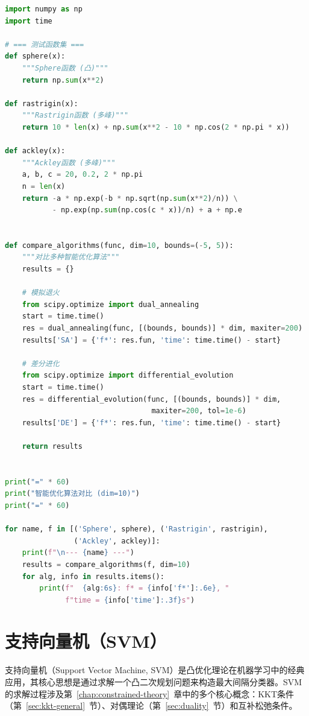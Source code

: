 \begin{lstlisting}[language=Python, caption=多种智能算法对比测试]
import numpy as np
import time

# === 测试函数集 ===
def sphere(x):
    """Sphere函数 (凸)"""
    return np.sum(x**2)

def rastrigin(x):
    """Rastrigin函数 (多峰)"""
    return 10 * len(x) + np.sum(x**2 - 10 * np.cos(2 * np.pi * x))

def ackley(x):
    """Ackley函数 (多峰)"""
    a, b, c = 20, 0.2, 2 * np.pi
    n = len(x)
    return -a * np.exp(-b * np.sqrt(np.sum(x**2)/n)) \
           - np.exp(np.sum(np.cos(c * x))/n) + a + np.e


def compare_algorithms(func, dim=10, bounds=(-5, 5)):
    """对比多种智能优化算法"""
    results = {}
    
    # 模拟退火
    from scipy.optimize import dual_annealing
    start = time.time()
    res = dual_annealing(func, [(bounds, bounds)] * dim, maxiter=200)
    results['SA'] = {'f*': res.fun, 'time': time.time() - start}
    
    # 差分进化
    from scipy.optimize import differential_evolution
    start = time.time()
    res = differential_evolution(func, [(bounds, bounds)] * dim, 
                                  maxiter=200, tol=1e-6)
    results['DE'] = {'f*': res.fun, 'time': time.time() - start}
    
    return results


print("=" * 60)
print("智能优化算法对比 (dim=10)")
print("=" * 60)

for name, f in [('Sphere', sphere), ('Rastrigin', rastrigin), 
                ('Ackley', ackley)]:
    print(f"\n--- {name} ---")
    results = compare_algorithms(f, dim=10)
    for alg, info in results.items():
        print(f"  {alg:6s}: f* = {info['f*']:.6e}, "
              f"time = {info['time']:.3f}s")
\end{lstlisting}

\newpage

\section{支持向量机（SVM）}\label{sec:svm}

支持向量机（Support Vector Machine, SVM）是凸优化理论在机器学习中的经典应用，其核心思想是通过求解一个凸二次规划问题来构造最大间隔分类器。SVM的求解过程涉及第~\ref{chap:constrained-theory}~章中的多个核心概念：KKT条件（第~\ref{sec:kkt-general}~节）、对偶理论（第~\ref{sec:duality}~节）和互补松弛条件。

